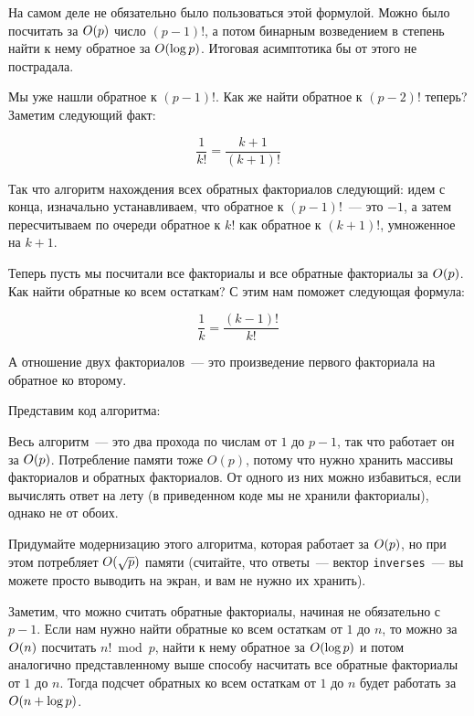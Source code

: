\begin{observation}
На самом деле не обязательно было пользоваться этой формулой. Можно было посчитать за $O(p)$ число $(p - 1)!$, а потом бинарным возведением в степень найти к нему обратное за $O(\log p)$. Итоговая асимптотика бы от этого не пострадала.
\end{observation}

Мы уже нашли обратное к $(p - 1)!$. Как же найти обратное к $(p - 2)!$ теперь?
Заметим следующий факт:

$$
\frac{1}{k!} = \frac{k + 1}{(k + 1)!}
$$


Так что алгоритм нахождения всех обратных факториалов следующий: идем с конца, изначально устанавливаем, что обратное к $(p - 1)!$~--- это $-1$, а затем пересчитываем по очереди обратное к $k!$ как обратное к $(k + 1)!$, умноженное на $k + 1$.

Теперь пусть мы посчитали все факториалы и все обратные факториалы за $O(p)$. Как найти обратные ко всем остаткам? С этим нам поможет следующая формула:

$$
\frac{1}{k} = \frac{(k - 1)!}{k!}
$$

А отношение двух факториалов~--- это произведение первого факториала на обратное ко второму.

Представим код алгоритма:



Весь алгоритм~--- это два прохода по числам от $1$ до $p - 1$, так что работает он за $O(p)$.
Потребление памяти тоже $O(p)$, потому что нужно хранить массивы факториалов и обратных факториалов.
От одного из них можно избавиться, если вычислять ответ на лету (в приведенном коде мы не хранили факториалы), однако не от обоих.

\begin{exercise}
    Придумайте модернизацию этого алгоритма, которая работает за $O(p)$, но при этом потребляет $O(\sqrt{p})$ памяти (считайте, что ответы~--- вектор \verb+inverses+~--- вы можете просто выводить на экран, и вам не нужно их хранить).
\end{exercise}

\begin{observation}
    Заметим, что можно считать обратные факториалы, начиная не обязательно с $p - 1$. Если нам нужно найти обратные ко всем остаткам от $1$ до $n$, то можно за $O(n)$ посчитать $n! \bmod p$, найти к нему обратное за $O(\log p)$ и потом аналогично представленному выше способу насчитать все обратные факториалы от $1$ до $n$. Тогда подсчет обратных ко всем остаткам от $1$ до $n$ будет работать за $O(n + \log p)$.
\end{observation}



